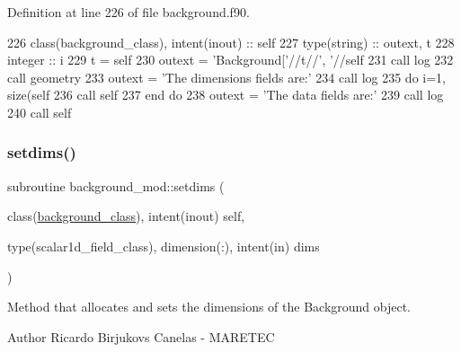 Definition at line 226 of file background.\+f90.


\begin{DoxyCode}
226     \textcolor{keywordtype}{class}(background\_class), \textcolor{keywordtype}{intent(inout)} :: self
227     \textcolor{keywordtype}{type}(string) :: outext, t
228     \textcolor{keywordtype}{integer} :: i
229     t = self%
230     outext = \textcolor{stringliteral}{'Background['}//t//\textcolor{stringliteral}{', '}//self%
231     \textcolor{keyword}{call }log%
232     \textcolor{keyword}{call }geometry%
233     outext = \textcolor{stringliteral}{'The dimensions fields are:'}
234     \textcolor{keyword}{call }log%
235     \textcolor{keywordflow}{do} i=1, \textcolor{keyword}{size}(self%
236         \textcolor{keyword}{call }self%
237 \textcolor{keywordflow}{    end do}
238     outext = \textcolor{stringliteral}{'The data fields are:'}
239     \textcolor{keyword}{call }log%
240     \textcolor{keyword}{call }self%
\end{DoxyCode}
\mbox{\label{namespacebackground__mod_a06d96d4627391d74feb105a842a87dc0}} 
\subsubsection{\texorpdfstring{setdims()}{setdims()}}
{\footnotesize\ttfamily subroutine background\+\_\+mod\+::setdims (\begin{DoxyParamCaption}\item[{class(\mbox{\hyperlink{structbackground__mod_1_1background__class}{background\+\_\+class}}), intent(inout)}]{self,  }\item[{type(scalar1d\+\_\+field\+\_\+class), dimension(\+:), intent(in)}]{dims }\end{DoxyParamCaption})\hspace{0.3cm}{\ttfamily [private]}}



Method that allocates and sets the dimensions of the Background object. 

\begin{DoxyAuthor}{Author}
Ricardo Birjukovs Canelas -\/ M\+A\+R\+E\+T\+EC 
\end{DoxyAuthor}


